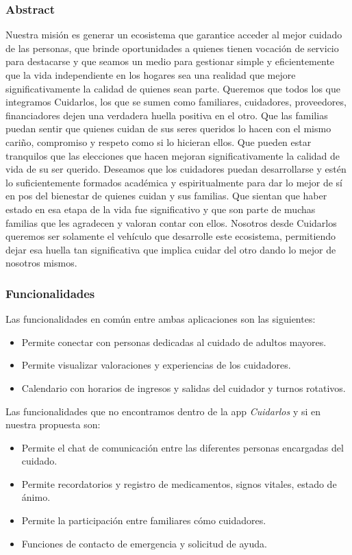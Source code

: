 \documentclass[a4paper,12pt]{article}
\begin{document}
    \subsubsection{Abstract}
    Nuestra misión es generar un ecosistema que garantice acceder al mejor cuidado de las personas, que brinde oportunidades a quienes tienen vocación de servicio para destacarse y que seamos un medio para gestionar simple y eficientemente que la vida independiente en los hogares sea una realidad que mejore
    significativamente la calidad de quienes sean parte. \newline
    Queremos que todos los que integramos Cuidarlos, los que se sumen como familiares, cuidadores, proveedores, financiadores dejen una verdadera huella positiva en el otro. Que las familias puedan sentir que quienes cuidan de sus seres queridos lo hacen con el mismo cariño, compromiso y respeto como si lo hicieran ellos. Que pueden estar tranquilos que las elecciones que hacen mejoran significativamente la calidad de vida de su ser querido. Deseamos que los cuidadores puedan desarrollarse y estén lo suficientemente formados académica y espiritualmente para dar lo mejor de sí en pos del bienestar de quienes cuidan y sus familias. Que sientan que haber estado en esa etapa de la vida fue significativo y que son parte de muchas familias que les agradecen y valoran contar con ellos. \newline
    Nosotros desde Cuidarlos queremos ser solamente el vehículo que desarrolle este ecosistema, permitiendo dejar esa huella tan significativa que implica cuidar del otro dando lo mejor de nosotros mismos. \newline
    \subsubsection{Funcionalidades}
    Las funcionalidades en común entre ambas aplicaciones son las siguientes:
    \begin{itemize}
        \item Permite conectar con personas dedicadas al cuidado de adultos mayores.
        \item Permite visualizar valoraciones y experiencias de los cuidadores.
        \item Calendario con horarios de ingresos y salidas del cuidador y turnos rotativos.
    \end{itemize}
    Las funcionalidades que no encontramos dentro de la app \textit{Cuidarlos} y si en nuestra propuesta son:
    \begin{itemize}
        \item Permite el chat de comunicación entre las diferentes personas encargadas del cuidado.
        \item Permite recordatorios y registro de medicamentos, signos vitales, estado de ánimo.
        \item Permite la participación entre familiares cómo cuidadores.
        \item Funciones de contacto de emergencia y solicitud de ayuda.
    \end{itemize}
\end{document}
